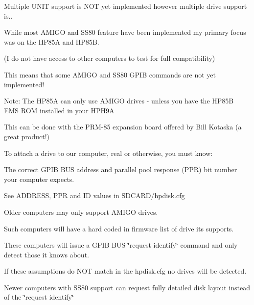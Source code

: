 Multiple U\+N\+IT support is N\+OT yet implemented however multiple drive support is..
\begin{DoxyItemize}
\item While most A\+M\+I\+GO and S\+S80 feature have been implemented my primary focus was on the H\+P85A and H\+P85B.
\begin{DoxyItemize}
\item (I do not have access to other computers to test for full compatibility)
\item This means that some A\+M\+I\+GO and S\+S80 G\+P\+IB commands are not yet implemented!
\item Note\+: The H\+P85A can only use A\+M\+I\+GO drives -\/ unless you have the H\+P85B E\+MS R\+OM installed in your H\+P\+H9A
\begin{DoxyItemize}
\item This can be done with the P\+R\+M-\/85 expansion board offered by Bill Kotaska (a great product!)
\end{DoxyItemize}
\end{DoxyItemize}
\item To attach a drive to our computer, real or otherwise, you must know\+:
\begin{DoxyItemize}
\item The correct G\+P\+IB B\+US address and parallel pool response (P\+PR) bit number your computer expects.
\begin{DoxyItemize}
\item See A\+D\+D\+R\+E\+SS, P\+PR and ID values in S\+D\+C\+A\+R\+D/hpdisk.\+cfg
\end{DoxyItemize}
\item Older computers may only support A\+M\+I\+GO drives.
\begin{DoxyItemize}
\item Such computers will have a hard coded in firmware list of drive its supports.
\begin{DoxyItemize}
\item These computers will issue a G\+P\+IB B\+US \char`\"{}request identify\char`\"{} command and only detect those it knows about.
\item If these assumptions do N\+OT match in the hpdisk.\+cfg no drives will be detected.
\end{DoxyItemize}
\end{DoxyItemize}
\item Newer computers with S\+S80 support can request fully detailed disk layout instead of the \char`\"{}request identify\char`\"{}

\end{DoxyItemize}
\end{DoxyItemize}
